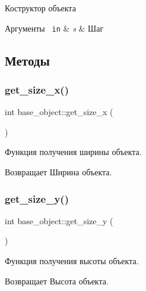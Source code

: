 Коструктор объекта 


\begin{DoxyParams}[1]{Аргументы}
\mbox{\texttt{ in}}  & {\em s} & Шаг \\
\hline
\end{DoxyParams}


\subsection{Методы}
\mbox{\label{classbase__object_a9b018abfe21170353c163cad9511f02c}} 
\subsubsection{\texorpdfstring{get\_size\_x()}{get\_size\_x()}}
{\footnotesize\ttfamily int base\+\_\+object\+::get\+\_\+size\+\_\+x (\begin{DoxyParamCaption}{ }\end{DoxyParamCaption})}



Функция получения ширины объекта. 

\begin{DoxyReturn}{Возвращает}
Ширина объекта. 
\end{DoxyReturn}
\mbox{\label{classbase__object_a58391e1cc3093e8b6ee1aaeadd8335d5}} 
\subsubsection{\texorpdfstring{get\_size\_y()}{get\_size\_y()}}
{\footnotesize\ttfamily int base\+\_\+object\+::get\+\_\+size\+\_\+y (\begin{DoxyParamCaption}{ }\end{DoxyParamCaption})}



Функция получения высоты объекта. 

\begin{DoxyReturn}{Возвращает}
Высота объекта. 
\end{DoxyReturn}
\mbox{\label{classbase__object_a53e9ce3dd05e9de706e05a5ec9df8d1e}} 
